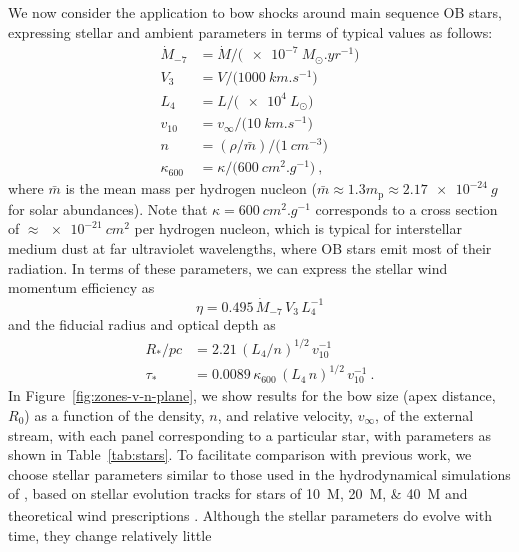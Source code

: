\message{ !name(dusty-bow-wave.tex)}\documentclass[useAMS, usenatbib, a4paper]{mnras}
\begin{document}
We now consider the application to bow shocks around main sequence OB
stars, expressing stellar and ambient parameters in terms of typical
values as follows:
\begin{align*}
  \label{eq:stellar-parameters}
  \dot{M}_{-7} &= \dot{M} / \bigl(\SI{e-7}{M_\odot.yr^{-1}}\bigr) \\
  V_3 &= V / \bigl(\SI{1000}{km.s^{-1}}\bigr) \\
  L_4 &= L / \bigl(\SI{e4}{L_\odot}\bigr) \\
  v_{10} &= v_\infty / \bigl( \SI{10}{km.s^{-1}} \bigr) \\
  n &= (\rho / \bar{m}) / \bigl( \SI{1}{cm^{-3}} \bigr) \\
  \kappa_{600} &= \kappa / \bigl( \SI{600}{cm^2.g^{-1}} \bigr) \ ,
\end{align*}
where \(\bar{m}\) is the mean mass per hydrogen nucleon
(\(\bar{m} \approx 1.3 m_{\text{p}} \approx \SI{2.17e-24}{g}\) for solar
abundances).  Note that \(\kappa = \SI{600}{cm^2.g^{-1}}\) corresponds to a
cross section of \(\approx \SI{e-21}{cm^2}\) per hydrogen nucleon, which is
typical for interstellar medium dust \citep{Bertoldi:1996a} at far
ultraviolet wavelengths, where OB stars emit most of their radiation.
In terms of these parameters, we can express the stellar wind momentum
efficiency as
\begin{equation}
  \label{eq:wind-eta-typical}
  \eta = \num{0.495} \,\dot{M}_{-7} \,V_3  \,L_4^{-1}
\end{equation}
and the fiducial radius and optical depth as
\begin{align}
  \label{eq:Rstar-typical}
  R_* / \si{pc} &= \num{2.21} \, (L_4 / n)^{1/2} \,v_{10}^{-1} \\
  \label{eq:taustar-typical}
  \tau_* &= \num{0.0089} \,\kappa_{600} \, (L_4 \,n)^{1/2} \,v_{10}^{-1} \ .
\end{align}
In Figure~\ref{fig:zones-v-n-plane}, we show results for the bow size
(apex distance, \(R_0\)) as a function of the density, \(n\), and
relative velocity, \(v_\infty\), of the external stream, with each panel
corresponding to a particular star, with parameters as shown in
Table~\ref{tab:stars}.  To facilitate comparison with previous work,
we choose stellar parameters similar to those used in the
hydrodynamical simulations of \citet{Meyer:2014b, Meyer:2016a,
  Meyer:2017a}, based on stellar evolution tracks for stars of
\SIlist{10;20;40}{M_\odot} \citep{Brott:2011a} and theoretical wind
prescriptions \citep{de-Jager:1988a, Vink:2000a}.  Although the
stellar parameters do evolve with time, they change relatively little
\end{document}
